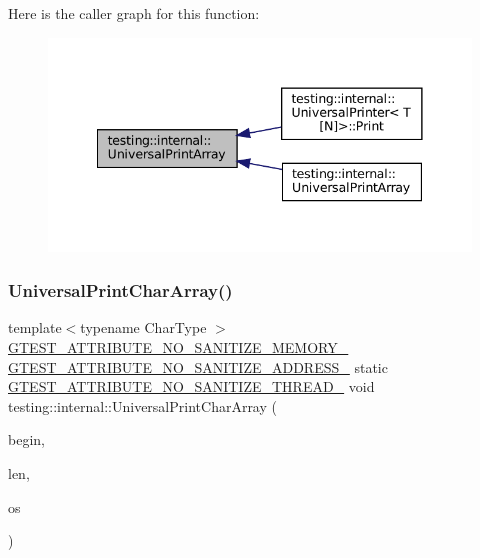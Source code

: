 Here is the caller graph for this function\+:
\nopagebreak
\begin{figure}[H]
\begin{center}
\leavevmode
\includegraphics[width=341pt]{namespacetesting_1_1internal_ae31e146c35fd75afc6a9cc73ae2692d1_icgraph}
\end{center}
\end{figure}
\mbox{\label{namespacetesting_1_1internal_ad896a4e4d9133ce43dc18b6038d95dc3}} 
\subsubsection{\texorpdfstring{Universal\+Print\+Char\+Array()}{UniversalPrintCharArray()}}
{\footnotesize\ttfamily template$<$typename Char\+Type $>$ \\
\hyperlink{gtest-port_8h_a2a83dd79037e53814a509cc3f5702650}{G\+T\+E\+S\+T\+\_\+\+A\+T\+T\+R\+I\+B\+U\+T\+E\+\_\+\+N\+O\+\_\+\+S\+A\+N\+I\+T\+I\+Z\+E\+\_\+\+M\+E\+M\+O\+R\+Y\+\_\+} \hyperlink{gtest-port_8h_af18b465f4ba6e36eea7a8d2d79521873}{G\+T\+E\+S\+T\+\_\+\+A\+T\+T\+R\+I\+B\+U\+T\+E\+\_\+\+N\+O\+\_\+\+S\+A\+N\+I\+T\+I\+Z\+E\+\_\+\+A\+D\+D\+R\+E\+S\+S\+\_\+} static \hyperlink{gtest-port_8h_abf30a6b1b3a12ecb2cc1bc1a6f5f9646}{G\+T\+E\+S\+T\+\_\+\+A\+T\+T\+R\+I\+B\+U\+T\+E\+\_\+\+N\+O\+\_\+\+S\+A\+N\+I\+T\+I\+Z\+E\+\_\+\+T\+H\+R\+E\+A\+D\+\_\+} void testing\+::internal\+::\+Universal\+Print\+Char\+Array (\begin{DoxyParamCaption}\item[{const Char\+Type $\ast$}]{begin,  }\item[{size\+\_\+t}]{len,  }\item[{ostream $\ast$}]{os }\end{DoxyParamCaption})\hspace{0.3cm}{\ttfamily [static]}}



